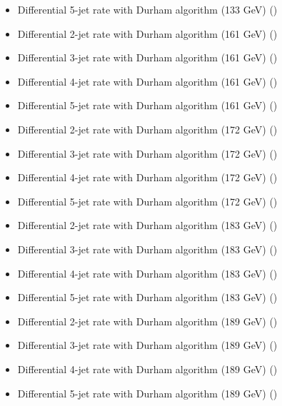 \begin{itemize}
  \item Differential 5-jet rate with Durham algorithm (133 GeV) ({\smaller {}})
  \item Differential 2-jet rate with Durham algorithm (161 GeV) ({\smaller {}})
  \item Differential 3-jet rate with Durham algorithm (161 GeV) ({\smaller {}})
  \item Differential 4-jet rate with Durham algorithm (161 GeV) ({\smaller {}})
  \item Differential 5-jet rate with Durham algorithm (161 GeV) ({\smaller {}})
  \item Differential 2-jet rate with Durham algorithm (172 GeV) ({\smaller {}})
  \item Differential 3-jet rate with Durham algorithm (172 GeV) ({\smaller {}})
  \item Differential 4-jet rate with Durham algorithm (172 GeV) ({\smaller {}})
  \item Differential 5-jet rate with Durham algorithm (172 GeV) ({\smaller {}})
  \item Differential 2-jet rate with Durham algorithm (183 GeV) ({\smaller {}})
  \item Differential 3-jet rate with Durham algorithm (183 GeV) ({\smaller {}})
  \item Differential 4-jet rate with Durham algorithm (183 GeV) ({\smaller {}})
  \item Differential 5-jet rate with Durham algorithm (183 GeV) ({\smaller {}})
  \item Differential 2-jet rate with Durham algorithm (189 GeV) ({\smaller {}})
  \item Differential 3-jet rate with Durham algorithm (189 GeV) ({\smaller {}})
  \item Differential 4-jet rate with Durham algorithm (189 GeV) ({\smaller {}})
  \item Differential 5-jet rate with Durham algorithm (189 GeV) ({\smaller {}})
\end{itemize}

\clearpage

